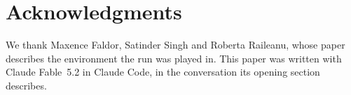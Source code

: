 \documentclass[11pt,a4paper]{article}
\begin{document}
\section*{Acknowledgments}

We thank Maxence Faldor, Satinder Singh and Roberta Raileanu, whose paper describes the environment the run was played in. This paper was written with Claude Fable~5.2 in Claude Code, in the conversation its opening section describes.



\end{document}
